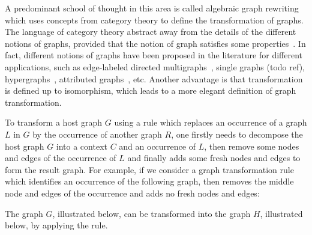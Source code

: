  A predominant school of thought in this area is called algebraic graph rewriting which uses concepts from category theory to define the transformation of graphs. The language of category theory abstract away from the details of the different notions of graphs, provided that the notion of graph satisfies some properties~\cite{lack2004adhesive,overbeek2023graph}. 
 In fact, different notions of graphs have been proposed in the literature for different applications, such as edge-labeled directed multigraphs~\cite{konig2018atutorial,corradini1997algebraic}, single graphs (todo ref), hypergraphs~\cite{plump1993hypergraph}, attributed graphs~\cite{ehrig2006fundamentals}, etc. Another advantage is that transformation is defined up to isomorphism, which leads to a more elegant definition of graph transformation.

  To transform a host graph $G$ using a rule which replaces an occurrence of a graph $L$ in $G$ by the occurrence of another graph $R$, one firstly needs to decompose the host graph $G$ into a context $C$ and an occurrence of $L$, then remove some nodes and edges of the occurrence of $L$ and finally adds some fresh nodes and edges to form the result graph. For example, if we consider a graph transformation rule which identifies an occurrence of the following graph, then removes the middle node and edges of the occurrence and adds no fresh nodes and edges:
\begin{center}
\end{center}
The graph $G$, illustrated below, can be transformed into the graph $H$, illustrated below, by applying the rule.
